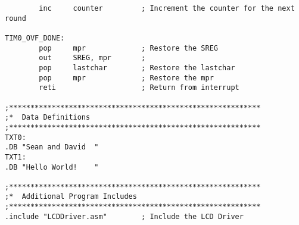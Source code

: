 \documentclass[12pt,letterpaper]{article}
\begin{document}
\begin{verbatim}
		inc		counter			; Increment the counter for the next round

TIM0_OVF_DONE:
		pop		mpr				; Restore the SREG
		out		SREG, mpr		; 
		pop		lastchar		; Restore the lastchar
		pop		mpr				; Restore the mpr
		reti					; Return from interrupt

;***********************************************************
;*	Data Definitions
;***********************************************************
TXT0:
.DB "Sean and David  "
TXT1:
.DB "Hello World!    "

;***********************************************************
;*	Additional Program Includes
;***********************************************************
.include "LCDDriver.asm"		; Include the LCD Driver
\end{verbatim}
\end{document}
